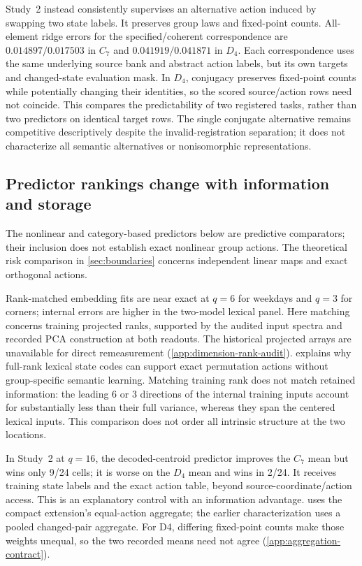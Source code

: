 Study~2 instead consistently supervises an alternative action induced by swapping two state labels. It preserves group laws and fixed-point counts. All-element ridge errors for the specified/coherent correspondence are $0.014897/0.017503$ in $C_7$ and $0.041919/0.041871$ in $D_4$. Each correspondence uses the same underlying source bank and abstract action labels, but its own targets and changed-state evaluation mask. In $D_4$, conjugacy preserves fixed-point counts while potentially changing their identities, so the scored source/action rows need not coincide. This compares the predictability of two registered tasks, rather than two predictors on identical target rows. The single conjugate alternative remains competitive descriptively despite the invalid-registration separation; it does not characterize all semantic alternatives or nonisomorphic representations.

\subsection{Predictor rankings change with information and storage}
The nonlinear and category-based predictors below are predictive comparators; their inclusion does not establish exact nonlinear group actions. The theoretical risk comparison in \cref{sec:boundaries} concerns independent linear maps and exact orthogonal actions.

Rank-matched embedding fits are near exact at $q=6$ for weekdays and $q=3$ for corners; internal errors are higher in the two-model lexical panel. Here matching concerns training projected ranks, supported by the audited input spectra and recorded PCA construction at both readouts. The historical projected arrays are unavailable for direct remeasurement (\cref{app:dimension-rank-audit}).  explains why full-rank lexical state codes can support exact permutation actions without group-specific semantic learning. Matching training rank does not match retained information: the leading 6 or 3 directions of the internal training inputs account for substantially less than their full variance, whereas they span the centered lexical inputs. This comparison does not order all intrinsic structure at the two locations.

In Study~2 at $q=16$, the decoded-centroid predictor improves the $C_7$ mean but wins only 9/24 cells; it is worse on the $D_4$ mean and wins in 2/24. It receives training state labels and the exact action table, beyond source-coordinate/action access. This is an explanatory control with an information advantage.  uses the compact extension's equal-action aggregate; the earlier characterization uses a pooled changed-pair aggregate. For D4, differing fixed-point counts make those weights unequal, so the two recorded means need not agree (\cref{app:aggregation-contract}).


